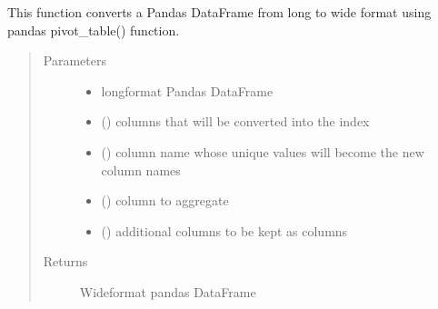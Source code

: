 \documentclass[letterpaper,10pt,english]{sphinxmanual}
\begin{document}
\begin{fulllineitems}
\label{\detokenize{_autosummary/analytics_core.analytics:analytics_core.analytics.analytics.transform_into_wide_format}}
This function converts a Pandas DataFrame from long to wide format using 
pandas pivot\_table() function.
\begin{quote}\begin{description}
\item[{Parameters}] \leavevmode\begin{itemize}
\item {} 
 \textendash{} long\sphinxhyphen{}format Pandas DataFrame

\item {} 
 () \textendash{} columns that will be converted into the index

\item {} 
 () \textendash{} column name whose unique values will become the new column names

\item {} 
 () \textendash{} column to aggregate

\item {} 
 () \textendash{} additional columns to be kept as columns

\end{itemize}

\item[{Returns}] \leavevmode
Wide\sphinxhyphen{}format pandas DataFrame

\end{description}\end{quote}


\end{fulllineitems}
\end{document}
